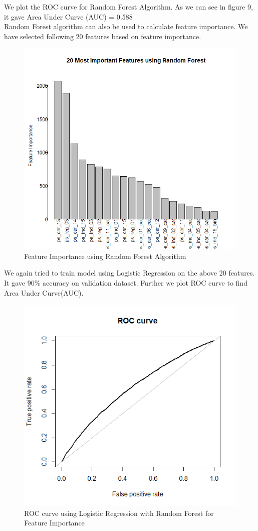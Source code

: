 \documentclass[fleqn,10pt]{SelfArx} %
\begin{document}
We plot the ROC curve for Random Forest Algorithm. As we can see in figure 9, it gave Area Under Curve (AUC) = 0.588\\


Random Forest algorithm can also be used to calculate feature importance. We have selected following 20 features based on feature importance.\\
\begin{figure}[h]
	\includegraphics[width=0.8\columnwidth]{plots/rf_feature_importance.png}\centering
	\caption{Feature Importance using Random Forest Algorithm}
	\end{figure}

We again tried to train model using Logistic Regression on the above 20 features. It gave 90\% accuracy on validation dataset. Further we plot ROC curve to find Area Under Curve(AUC).\\
\begin{figure}[h]
	\includegraphics[width=0.8\columnwidth]{plots/ROC_RF_LOG.png}\centering
	\caption{ROC curve using Logistic Regression with Random Forest for Feature Importance}
	\end{figure}
	
\end{document}

